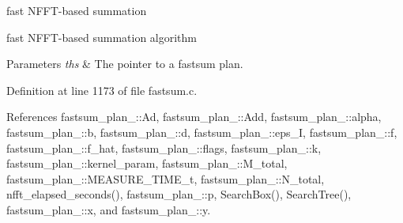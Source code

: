 fast N\-F\-F\-T-\/based summation 

fast N\-F\-F\-T-\/based summation algorithm


\begin{DoxyParams}{Parameters}
{\em ths} & The pointer to a fastsum plan. \\
\hline
\end{DoxyParams}


Definition at line 1173 of file fastsum.\-c.



References fastsum\-\_\-plan\-\_\-\-::\-Ad, fastsum\-\_\-plan\-\_\-\-::\-Add, fastsum\-\_\-plan\-\_\-\-::alpha, fastsum\-\_\-plan\-\_\-\-::b, fastsum\-\_\-plan\-\_\-\-::d, fastsum\-\_\-plan\-\_\-\-::eps\-\_\-\-I, fastsum\-\_\-plan\-\_\-\-::f, fastsum\-\_\-plan\-\_\-\-::f\-\_\-hat, fastsum\-\_\-plan\-\_\-\-::flags, fastsum\-\_\-plan\-\_\-\-::k, fastsum\-\_\-plan\-\_\-\-::kernel\-\_\-param, fastsum\-\_\-plan\-\_\-\-::\-M\-\_\-total, fastsum\-\_\-plan\-\_\-\-::\-M\-E\-A\-S\-U\-R\-E\-\_\-\-T\-I\-M\-E\-\_\-t, fastsum\-\_\-plan\-\_\-\-::\-N\-\_\-total, nfft\-\_\-elapsed\-\_\-seconds(), fastsum\-\_\-plan\-\_\-\-::p, Search\-Box(), Search\-Tree(), fastsum\-\_\-plan\-\_\-\-::x, and fastsum\-\_\-plan\-\_\-\-::y.

